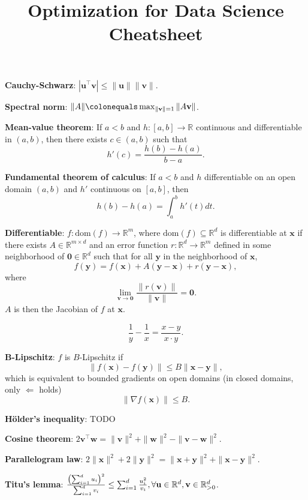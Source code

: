 \documentclass{article}
\title{Optimization for Data Science Cheatsheet}
\newcommand{\lft}{\mathopen{}\mathclose\bgroup\left}
\newcommand{\rgt}{\aftergroup\egroup\right}
\newcommand{\R}{\mathbb{R}}
\renewcommand{\vec}[1]{\mathbf{#1}}
\newcommand{\mat}[1]{#1}
\newcommand{\transpose}[1]{#1^\top}
\newcommand{\dom}[1]{\mathrm{dom}(#1)}
\begin{document}
\setlength{\columnsep}{0.2cm}

\begin{multicols*}{2}
    \textbf{Cauchy-Schwarz}: $|\transpose{\vec{u}} \vec{v}| \leq \| \vec{u} \| \| \vec{v} \|$.

    \textbf{Spectral norm}: $\| \mat{A} \| \colonequals \max_{\| \vec{v} \| = 1} \| \mat{A} \vec{v} \|$.

    \textbf{Mean-value theorem}: If $a < b$ and $h: [a,b] \to \R$ continuous and differentiable in $(a,b)$, then
    there exists $c \in (a,b)$ such that \[
        h'(c) = \frac{h(b) - h(a)}{b-a}.
    \]

    \textbf{Fundamental theorem of calculus}: If $a < b$ and $h$ differentiable on an open domain $(a,b)$ and
    $h'$ continuous on $[a,b]$, then \[
        h(b) - h(a) = \int_a^b h'(t)dt.
    \]

    \textbf{Differentiable}: $f: \dom{f} \to \R^m$, where $\dom{f} \subseteq \R^d$ is differentiable at
    $\vec{x}$ if there exists $\mat{A} \in \R^{m \times d}$ and an error function $r: \R^d \to \R^m$
    defined in some neighborhood of $\vec{0} \in \R^d$ such that for all $\vec{y}$ in the neighborhood
    of $\vec{x}$, \[
        f(\vec{y}) = f(\vec{x}) + \mat{A} (\vec{y} - \vec{x}) + r(\vec{y} - \vec{x}),
    \]
    where \[
        \lim_{\vec{v} \to \vec{0}} \frac{\| r(\vec{v}) \|}{\| \vec{v} \|} = \vec{0}.
    \]
    $\mat{A}$ is then the Jacobian of $f$ at $\vec{x}$.

    \[
        \frac{1}{y} - \frac{1}{x} = \frac{x-y}{x\cdot y}.
    \]

    \textbf{B-Lipschitz}: $f$ is $B$-Lipschitz if \[
        \| f(\vec{x}) - f(\vec{y}) \| \leq B \| \vec{x} - \vec{y} \|,
    \]
    which is equivalent to bounded gradients on open domains (in closed domains, only $\Leftarrow$
    holds) \[
        \| \nabla f(\vec{x}) \| \leq B.
    \]

    \textbf{H\"older's inequality}: TODO

    \textbf{Cosine theorem}: $2 \transpose{\vec{v}}\vec{w} = \| \vec{v} \|^2 + \| \vec{w} \|^2 - \| \vec{v} - \vec{w} \|^2$.

    \textbf{Parallelogram law}: $2 \| \vec{x} \|^2 + 2 \| \vec{y} \|^2 = \| \vec{x} + \vec{y} \|^2 + \| \vec{x} - \vec{y} \|^2$.

    \textbf{Titu's lemma}: $\frac{\lft( \sum_{i=1}^{d} u_i \rgt)^2}{\sum_{i=1}^{d} v_i} \leq \sum_{i=1}^{d} \frac{u_i^2}{v_i}, \forall \vec{u} \in \R^d, \vec{v} \in \R^d_{>0}$.


\end{multicols*}
\end{document}
